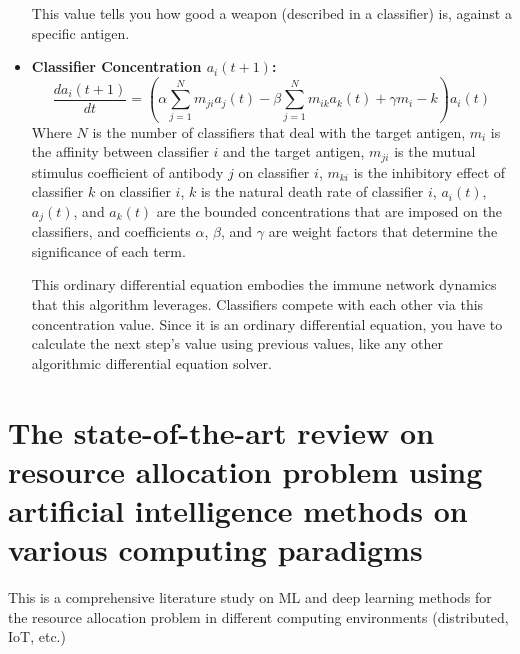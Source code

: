 \documentclass[12pt]{article} %
\begin{document}
\begin{itemize}
            This value tells you how good a weapon (described in a classifier) is, against a specific antigen. 

        \item \textbf{Classifier Concentration $a_i(t+1)$: }
            \begin{equation}
                \frac{da_i(t+1)}{dt} = \left(
                    \alpha \sum^{N}_{j=1}m_{ji}a_j(t) - \beta\sum^{N}_{j=1}m_{ik}a_k(t) + \gamma m_i - k
                    \right) a_i(t)
            \end{equation}
            Where $N$ is the number of classifiers that deal with the target antigen, $m_i$ is the affinity between classifier $i$ and the target antigen, $m_{ji}$ is the mutual stimulus coefficient of antibody $j$ on classifier $i$, $m_{ki}$ is the inhibitory effect of classifier $k$ on classifier $i$, $k$ is the natural death rate of classifier $i$, $a_i(t)$, $a_j(t)$, and $a_k(t)$ are the bounded concentrations that are imposed on the classifiers, and coefficients $\alpha$, $\beta$, and $\gamma$ are weight factors that determine the significance of each term. 
            
            This ordinary differential equation embodies the immune network dynamics that this algorithm leverages. Classifiers compete with each other via this concentration value. Since it is an ordinary differential equation, you have to calculate the next step's value using previous values, like any other algorithmic differential equation solver.  
    \end{itemize} 
    
    
\section*{The state-of-the-art review on resource allocation problem using artificial intelligence methods on various computing paradigms \cite{resourceAlloc_joloudari_2022}}
    This is a comprehensive literature study on ML and deep learning methods for the resource allocation problem in different computing environments (distributed, IoT, etc.)
    
\end{document}
